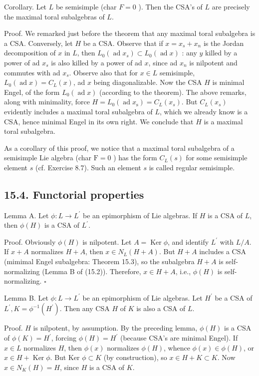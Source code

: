 \documentclass[10pt]{article}
\begin{document}
Corollary. Let $L$ be semisimple (char $F=0$ ). Then the CSA's of $L$ are precisely the maximal toral subalgebras of $L$.

Proof. We remarked just before the theorem that any maximal toral subalgebra is a CSA. Conversely, let $H$ be a CSA. Observe that if $x=x_{s}+x_{n}$ is the Jordan decomposition of $x$ in $L$, then $L_{0}\left(\operatorname{ad} x_{s}\right) \subset L_{0}(\operatorname{ad} x)$ : any $y$ killed by a power of ad $x_{s}$ is also killed by a power of ad $x$, since ad $x_{n}$ is nilpotent and commutes with ad $x_{s}$. Observe also that for $x \in L$ semisimple, $L_{0}(\operatorname{ad} x)=C_{L}(x)$, ad $x$ being diagonalizable. Now the CSA $H$ is minimal Engel, of the form $L_{0}(\operatorname{ad} x)$ (according to the theorem). The above remarks, along with minimality, force $H=L_{0}\left(\operatorname{ad} x_{\mathrm{s}}\right)=C_{L}\left(x_{s}\right)$. But $C_{L}\left(x_{s}\right)$ evidently includes a maximal toral subalgebra of $L$, which we already know is a CSA, hence minimal Engel in its own right. We conclude that $H$ is a maximal toral subalgebra.

As a corollary of this proof, we notice that a maximal toral subalgebra of a semisimple Lie algebra (char $\mathrm{F}=0$ ) has the form $C_{L}(s)$ for some semisimple element $s$ (cf. Exercise 8.7). Such an element $s$ is called regular semisimple.

\subsection*{15.4. Functorial properties}
Lemma A. Let $\phi: L \rightarrow L^{\prime}$ be an epimorphism of Lie algebras. If $H$ is a CSA of $L$, then $\phi(H)$ is a CSA of $L^{\prime}$.

Proof. Obviously $\phi(H)$ is nilpotent. Let $A=\operatorname{Ker} \phi$, and identify $L^{\prime}$ with $L / A$. If $x+A$ normalizes $H+A$, then $x \in N_{L}(H+A)$. But $H+A$ includes a CSA (mimimal Engel subalgebra: Theorem 15.3), so the subalgebra $H+A$ is self-normalizing (Lemma B of (15.2)). Therefore, $x \in H+A$, i.e., $\phi(H)$ is self-normalizing. $\square$

Lemma B. Let $\phi: L \rightarrow L^{\prime}$ be an epimorphism of Lie algebras. Let $H^{\prime}$ be a CSA of $L^{\prime}, K=\phi^{-1}\left(H^{\prime}\right)$. Then any CSA $H$ of $K$ is also a CSA of $L$.

Proof. $H$ is nilpotent, by assumption. By the preceding lemma, $\phi(H)$ is a CSA of $\phi(K)=H^{\prime}$, forcing $\phi(H)=H^{\prime}$ (because CSA's are minimal Engel). If $x \in L$ normalizes $H$, then $\phi(x)$ normalizes $\phi(H)$, whence $\phi(x) \in \phi(H)$, or $x \in H+\operatorname{Ker} \phi$. But Ker $\phi \subset K$ (by construction), so $x \in H+K \subset K$. Now $x \in N_{K}(H)=H$, since $H$ is a CSA of $K$.
\end{document}
